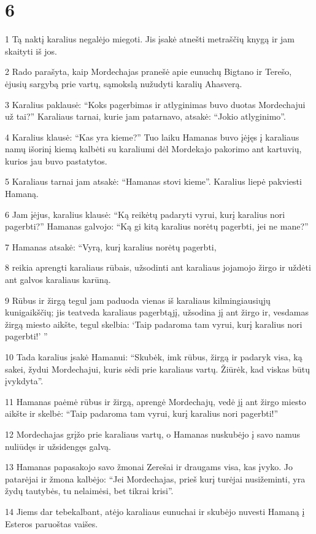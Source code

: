\chapter{6}


\par 1 Tą naktį karalius negalėjo miegoti. Jis įsakė atnešti metraščių knygą ir jam skaityti iš jos. 
\par 2 Rado parašyta, kaip Mordechajas pranešė apie eunuchų Bigtano ir Terešo, ėjusių sargybą prie vartų, sąmokslą nužudyti karalių Ahasverą. 
\par 3 Karalius paklausė: “Koks pagerbimas ir atlyginimas buvo duotas Mordechajui už tai?” Karaliaus tarnai, kurie jam patarnavo, atsakė: “Jokio atlyginimo”. 
\par 4 Karalius klausė: “Kas yra kieme?” Tuo laiku Hamanas buvo įėjęs į karaliaus namų išorinį kiemą kalbėti su karaliumi dėl Mordekajo pakorimo ant kartuvių, kurios jau buvo pastatytos. 
\par 5 Karaliaus tarnai jam atsakė: “Hamanas stovi kieme”. Karalius liepė pakviesti Hamaną. 
\par 6 Jam įėjus, karalius klausė: “Ką reikėtų padaryti vyrui, kurį karalius nori pagerbti?” Hamanas galvojo: “Ką gi kitą karalius norėtų pagerbti, jei ne mane?” 
\par 7 Hamanas atsakė: “Vyrą, kurį karalius norėtų pagerbti, 
\par 8 reikia aprengti karaliaus rūbais, užsodinti ant karaliaus jojamojo žirgo ir uždėti ant galvos karaliaus karūną. 
\par 9 Rūbus ir žirgą tegul jam paduoda vienas iš karaliaus kilmingiausiųjų kunigaikščių; jis teatveda karaliaus pagerbtąjį, užsodina jį ant žirgo ir, vesdamas žirgą miesto aikšte, tegul skelbia: ‘Taip padaroma tam vyrui, kurį karalius nori pagerbti!’ ” 
\par 10 Tada karalius įsakė Hamanui: “Skubėk, imk rūbus, žirgą ir padaryk visa, ką sakei, žydui Mordechajui, kuris sėdi prie karaliaus vartų. Žiūrėk, kad viskas būtų įvykdyta”. 
\par 11 Hamanas paėmė rūbus ir žirgą, aprengė Mordechajų, vedė jį ant žirgo miesto aikšte ir skelbė: “Taip padaroma tam vyrui, kurį karalius nori pagerbti!” 
\par 12 Mordechajas grįžo prie karaliaus vartų, o Hamanas nuskubėjo į savo namus nuliūdęs ir užsidengęs galvą. 
\par 13 Hamanas papasakojo savo žmonai Zerešai ir draugams visa, kas įvyko. Jo patarėjai ir žmona kalbėjo: “Jei Mordechajas, prieš kurį turėjai nusižeminti, yra žydų tautybės, tu nelaimėsi, bet tikrai krisi”. 
\par 14 Jiems dar tebekalbant, atėjo karaliaus eunuchai ir skubėjo nuvesti Hamaną į Esteros paruoštas vaišes.



